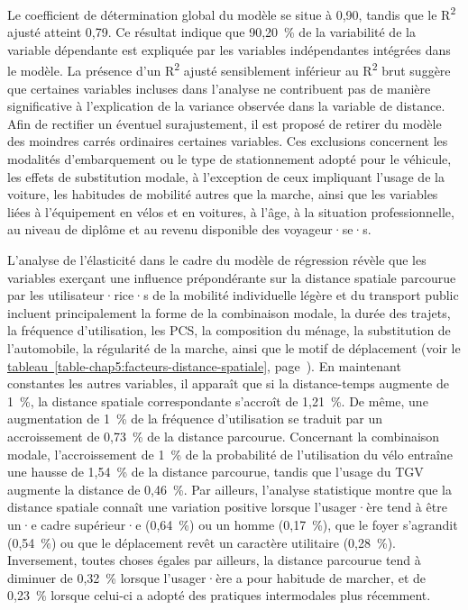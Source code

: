 \begin{refsegment}
Le coefficient de détermination global du modèle se situe à 0,90, tandis que le R\textsuperscript{2} ajusté atteint 0,79. Ce résultat indique que 90,20~\% de la variabilité de la variable dépendante est expliquée par les variables indépendantes intégrées dans le modèle. La présence d'un R\textsuperscript{2} ajusté sensiblement inférieur au R\textsuperscript{2} brut suggère que certaines variables incluses dans l'analyse ne contribuent pas de manière significative à l'explication de la variance observée dans la variable de distance. Afin de rectifier un éventuel surajustement, il est proposé de retirer du modèle des moindres carrés ordinaires certaines variables. Ces exclusions concernent les modalités d'embarquement ou le type de stationnement adopté pour le véhicule, les effets de substitution modale, à l'exception de ceux impliquant l'usage de la voiture, les habitudes de mobilité autres que la marche, ainsi que les variables liées à l'équipement en vélos et en voitures, à l'âge, à la situation professionnelle, au niveau de diplôme et au revenu disponible des voyageur·se·s.%


L'analyse de l'élasticité dans le cadre du modèle de régression révèle que les variables exerçant une influence prépondérante sur la distance spatiale parcourue par les utilisateur·rice·s de la mobilité individuelle légère et du transport public incluent principalement la forme de la combinaison modale, la durée des trajets, la fréquence d'utilisation, les \acrfull{PCS}, la composition du ménage, la substitution de l'automobile, la régularité de la marche, ainsi que le motif de déplacement (voir le \hyperref[table-chap5:facteurs-distance-spatiale]{tableau~\ref{table-chap5:facteurs-distance-spatiale}}, page~\pageref{table-chap5:facteurs-distance-spatiale}). En maintenant constantes les autres variables, il apparaît que si la distance-temps augmente de 1~\%, la distance spatiale correspondante s'accroît de 1,21~\%. De même, une augmentation de 1~\% de la fréquence d'utilisation se traduit par un accroissement de 0,73~\% de la distance parcourue. Concernant la combinaison modale, l'accroissement de 1~\% de la probabilité de l'utilisation du vélo entraîne une hausse de 1,54~\% de la distance parcourue, tandis que l'usage du \acrshort{TGV} augmente la distance de 0,46~\%. Par ailleurs, l'analyse statistique montre que la distance spatiale connaît une variation positive lorsque l'usager·ère tend à être un·e cadre supérieur·e (0,64~\%) ou un homme (0,17~\%), que le foyer s'agrandit (0,54~\%) ou que le déplacement revêt un caractère utilitaire (0,28~\%). Inversement, toutes choses égales par ailleurs, la distance parcourue tend à diminuer de 0,32~\% lorsque l'usager·ère a pour habitude de marcher, et de 0,23~\% lorsque celui-ci a adopté des pratiques intermodales plus récemment.%


\end{refsegment}
